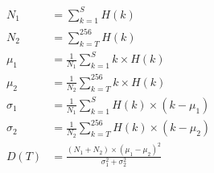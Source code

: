 \documentclass[a4paper]{article}
\begin{document}
\begin{align*}
	N_1 &= \sum _{k = 1} ^ {S} H(k) \\
	N_2 &= \sum _{k = T} ^ {256} H(k) \\
	\mu_1 &= \frac{1}{N_1} \sum _{k = 1} ^ {S} k \times H(k) \\
	\mu_2 &= \frac{1}{N_2} \sum _{k = T} ^ {256} k \times H(k) \\ 
	\sigma_1 &= \frac{1}{N_1} \sum _{k = 1} ^ {S} H(k) \times (k - \mu_1) \\
	\sigma_2 &= \frac{1}{N_2} \sum _{k = T} ^ {256} H(k) \times (k - \mu_2) \\
	D(T) &= \frac{(N_1 + N_2) \times (\mu_1 - \mu_2)^2}{\sigma_1^2 + \sigma_2^2}
\end{align*}
\end{document}
